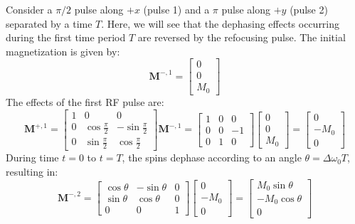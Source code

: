 \documentclass[11pt]{article}
\theoremstyle{definition}
\begin{document}
Consider a $\pi/2$ pulse along $+x$ (pulse 1) and a $\pi$ pulse along $+y$ (pulse 2) separated by a time $T$. Here, we will see that the dephasing effects occurring during the first time period $T$ are reversed by the refocusing pulse. The initial magnetization is given by: 
\begin{equation}
    \mathbf{M}^{-,1} = \begin{bmatrix}
        0 \\ 0 \\ M_0
    \end{bmatrix}
\end{equation}
The effects of the first RF pulse are:
\begin{equation}
    \mathbf{M}^{+,1} = \begin{bmatrix}
        1 & 0 & 0 \\ 
        0 & \cos\frac{\pi}{2} & -\sin\frac{\pi}{2} \\
        0 & \sin\frac{\pi}{2} & \cos\frac{\pi}{2}
    \end{bmatrix}
    \mathbf{M}^{-,1}=
    \begin{bmatrix}
        1 & 0 & 0 \\
        0 & 0 & -1 \\ 
        0 & 1 & 0
    \end{bmatrix}
    \begin{bmatrix}
        0 \\ 0 \\ M_0
    \end{bmatrix}
    =\begin{bmatrix}
        0 \\ -M_0 \\ 0
    \end{bmatrix}
\end{equation}
During time $t=0$ to $t=T$, the spins dephase according to an angle $\theta=\Delta \omega _0 T$, resulting in: 
\begin{equation}
    \mathbf{M}^{-,2} = \begin{bmatrix} 
        \cos\theta & -\sin\theta & 0 \\
        \sin\theta & \cos\theta & 0 \\ 
        0 & 0 & 1 
    \end{bmatrix}\begin{bmatrix}
        0 \\ -M_0 \\ 0
    \end{bmatrix}=
    \begin{bmatrix}
        M_0 \sin\theta \\ 
        -M_0 \cos\theta \\ 
        0
    \end{bmatrix}
\end{equation}
\end{document}
